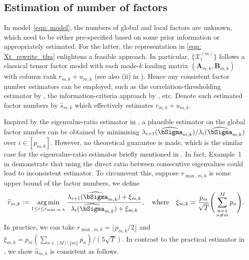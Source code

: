 \documentclass[aos]{imsart}
\theoremstyle{plain}
\theoremstyle{definition}
\DeclareMathOperator*{\argmin}{arg\,min}
\def\wh#1{\widehat{#1}}
\def\cG{\mathcal{G}} \def\cH{\boldsymbol{\mathcal{H}}} \def\cI{\mathcal{I}}
\def\cX{\mathcal{X}}
\def\bA{\mathbf{A}}
\def\bB{\mathbf{B}}
\begin{document}




\subsection{Estimation of number of factors}
\label{subsec: est_num_fac}

In model~\eqref{eqn: model}, the numbers of global and local factors are unknown, which need to be either pre-specified based on some prior information or appropriately estimated. For the latter, the representation in \eqref{eqn: Xt_rewrite_tfm} enlightens a feasible approach. In particular, $\{\cX_t^{(m)}\}$ follows a classical tensor factor model with each mode-$k$ loading matrix $(\bA_{m,k}, \bB_{m,k})$ with column rank $r_{m,k} +u_{m,k}$ (see also (ii) in ). Hence any consistent factor number estimators can be employed, such as the correlation-thresholding estimator by \cite{Lam2021}, the information-criteria approach by \cite{Hanetal2022}, etc. Denote such estimated factor numbers by $\wh{s}_{m,k}$ which effectively estimates $r_{m,k} +u_{m,k}$. 

Inspired by the eigenvalue-ratio estimator in \cite{Zhangetal2025}, a plausible estimator on the global factor number can be obtained by minimising $\lambda_{i+1}(\wh\bSigma_{m,k}) /\lambda_i (\wh\bSigma_{m,k})$ over $i\in[p_{m,k}]$. However, no theoretical guarantee is made, which is the similar case for the eigenvalue-ratio estimator briefly mentioned in \cite{Wangetal2019}. In fact, Example~1 in \cite{Zhangetal2024} demonstrate that using the direct ratio between consecutive eigenvalues could lead to inconsistent estimator. To circumvent this, suppose $r_{\max,m,k}$ is some upper bound of the factor numbers, we define
\begin{equation}
\label{eqn: est_num_fac_define}
\wh{r}_{m,k} := \argmin_{1\leq i\leq r_{\max,m,k}} \frac{\lambda_{i+1}(\wh\bSigma_{m,k}) + \xi_{m,k}}{ \lambda_i (\wh\bSigma_{m,k}) +\xi_{m,k}} , \quad \text{where} \quad
\xi_{m,k} \asymp \frac{p_m}{\sqrt{T}} \Bigg( \sum_{\substack{n=1\\ n\neq m}}^M p_n \Bigg) .
\end{equation}
In practice, we can take $r_{\max,m,k}=\lfloor p_{m,k}/2 \rfloor$ and $\xi_{m,k} = p_m(\sum_{n\in[M] \setminus \{m\}} p_n) /(5\sqrt{T})$. In contrast to the practical estimator in \cite{Zhangetal2024}, we show $\wh{u}_{m,k}$ is consistent as follows.
\end{document}
